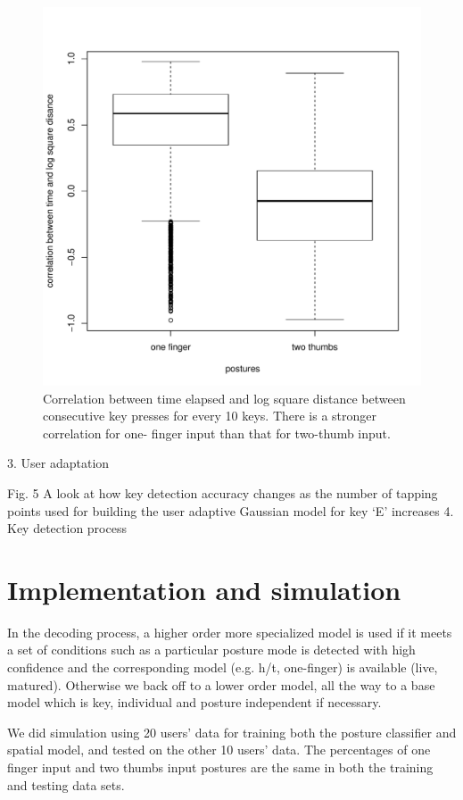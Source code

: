 \documentclass{sigchi}
\begin{document}
\begin{figure}[tb]
  \centering
  \includegraphics[width=1\columnwidth]{figures/boxplot.pdf}
  \caption{Correlation between time elapsed and log square distance between
  consecutive key presses for every 10 keys. There is a stronger correlation for
  one- finger input than that for two-thumb input.}
  \label{fig:boxplot}
\end{figure}

3. User adaptation

Fig. 5  A look at how key detection accuracy changes as the number of tapping points used for building the user adaptive Gaussian model for key ‘E’ increases
4. Key detection process 

\section{Implementation and simulation}
In the decoding process, a higher order more specialized model is used if it
meets a set of conditions such as a particular posture mode is detected with high confidence and the corresponding model (e.g. h/t, one-finger) is available (live, matured). Otherwise we back off to a lower order model, all the way to a base model which is key, individual and posture independent if necessary.

We did simulation using 20 users' data for training both the posture
classifier and spatial model, and tested on the other 10 users' data. The
percentages of one finger input and two thumbs input postures are the same in
both the training and testing data sets.
\end{document}
